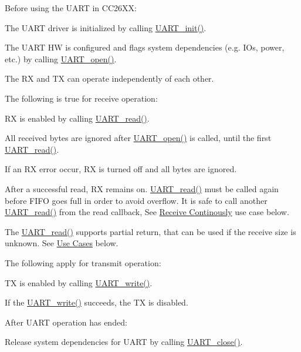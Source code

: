 Before using the U\-A\-R\-T in C\-C26\-X\-X\-:
\begin{DoxyItemize}
\item The U\-A\-R\-T driver is initialized by calling \hyperlink{_u_a_r_t_8h_ab60a36f7295d704926120d22f806dcd1}{U\-A\-R\-T\-\_\-init()}.
\item The U\-A\-R\-T H\-W is configured and flags system dependencies (e.\-g. I\-Os, power, etc.) by calling \hyperlink{_u_a_r_t_8h_a0442ea1ec23901168da31726bb3254c1}{U\-A\-R\-T\-\_\-open()}.
\item The R\-X and T\-X can operate independently of each other.
\end{DoxyItemize}The following is true for receive operation\-:
\begin{DoxyItemize}
\item R\-X is enabled by calling \hyperlink{_u_a_r_t_8h_a023152d57539cad94bdd813956013e73}{U\-A\-R\-T\-\_\-read()}.
\item All received bytes are ignored after \hyperlink{_u_a_r_t_8h_a0442ea1ec23901168da31726bb3254c1}{U\-A\-R\-T\-\_\-open()} is called, until the first \hyperlink{_u_a_r_t_8h_a023152d57539cad94bdd813956013e73}{U\-A\-R\-T\-\_\-read()}.
\item If an R\-X error occur, R\-X is turned off and all bytes are ignored.
\item After a successful read, R\-X remains on. \hyperlink{_u_a_r_t_8h_a023152d57539cad94bdd813956013e73}{U\-A\-R\-T\-\_\-read()} must be called again before F\-I\-F\-O goes full in order to avoid overflow. It is safe to call another \hyperlink{_u_a_r_t_8h_a023152d57539cad94bdd813956013e73}{U\-A\-R\-T\-\_\-read()} from the read callback, See \hyperlink{_u_a_r_t_c_c26_x_x_8h_USE_CASE_CB}{Receive Continously} use case below.
\item The \hyperlink{_u_a_r_t_8h_a023152d57539cad94bdd813956013e73}{U\-A\-R\-T\-\_\-read()} supports partial return, that can be used if the receive size is unknown. See \hyperlink{_u_a_r_t_c_c26_x_x_8h_USE_CASES}{Use Cases} below.
\end{DoxyItemize}The following apply for transmit operation\-:
\begin{DoxyItemize}
\item T\-X is enabled by calling \hyperlink{_u_a_r_t_8h_a6f2a04c09dc17886e69e361cd80aaedc}{U\-A\-R\-T\-\_\-write()}.
\item If the \hyperlink{_u_a_r_t_8h_a6f2a04c09dc17886e69e361cd80aaedc}{U\-A\-R\-T\-\_\-write()} succeeds, the T\-X is disabled.
\end{DoxyItemize}After U\-A\-R\-T operation has ended\-:
\begin{DoxyItemize}
\item Release system dependencies for U\-A\-R\-T by calling \hyperlink{_u_a_r_t_8h_a6b49b65f3db709c408dc4db23a68895d}{U\-A\-R\-T\-\_\-close()}.
\end{DoxyItemize}

